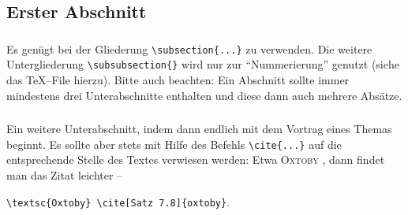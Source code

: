 \begin{abstract}
\noindent
Hier steht eine kurze Zusammenfassung des Inhalts des Vortrags oder der Hausarbeit.
Dazu dieses \TeX{}--File kopieren und umbenennen.
Weitergehende Literatur ist im  Literatur\-verzeichnis aufgeführt, wobei ich das Buch von \textsc{Voss} \cite{voss-wiss} empfehlen kann.
Für einen Einstieg empfehle ich \emph{l2kurz.pdf}, dass man auf 
%
\begin{center}
\texttt{http://mirror.ctan.org/info/lshort/german/} 
\end{center}
%
findet -- weiteres dann in meinem Erläuterungen \emph{Sem-ReadMe.pdf}.
Ein Teil der hier angegeben Literatur und weiteres findet sich auf ILIAS \bzw in dem \og PDF.
\end{abstract}
%
\subsection{Erster Abschnitt}\label{sec:erster-abschnitt}
\subsubsection{}
Es genügt bei der Gliederung  \verb|\subsection{...}| zu verwenden.
Die weitere Untergliederung \verb|\subsubsection{}| wird nur zur \enquote{Nummerierung} genutzt (siehe das \TeX{}--File hierzu).
Bitte auch beachten: Ein Abschnitt sollte immer mindestens drei Unterabschnitte enthalten und diese dann auch mehrere Absätze. 

%
\subsubsection{} 
Ein weitere Unterabschnitt, indem dann endlich mit dem Vortrag eines Themas beginnt. 
Es sollte aber stets mit Hilfe des Befehls \verb|\cite{...}| auf die entsprechende Stelle des Textes verwiesen werden: Etwa \textsc{Oxtoby} \cite[Satz 7.8]{oxtoby}, dann findet man das Zitat leichter -- 
%
\begin{center}
\verb|\textsc{Oxtoby} \cite[Satz 7.8]{oxtoby}|.
\end{center}
%
